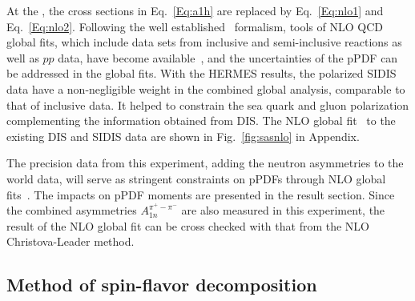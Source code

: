 At the \nloo, the cross sections in Eq.~\ref{Eq:a1h}  are replaced by Eq.~\ref{Eq:nlo1}
and Eq.~\ref{Eq:nlo2}. Following the well established~\cite{defs2000} formalism, 
tools of NLO QCD global fits,
which include data sets from inclusive and semi-inclusive reactions as well as $pp$ data,
have become available~\cite{sassotnlo,DSSV2008}, and the uncertainties of the pPDF 
can be addressed in the global fits.
With the HERMES results, the polarized SIDIS data 
have a non-negligible weight in the combined global analysis, 
comparable to that of inclusive data. It helped 
to constrain the sea quark and gluon polarization complementing 
the information obtained from DIS.
The NLO global fit~\cite{sassotnlo} to the existing DIS and SIDIS data are shown in Fig.~\ref{fig:sasnlo} in Appendix. 

The precision data from this experiment, adding the 
 neutron asymmetries to the world data,  
will serve as stringent constraints on 
pPDFs through NLO global fits~\cite{epjcxj2006}.  
The impacts on pPDF moments are presented in the result section. 
Since the combined asymmetries $A_{1n}^{\pi^+ -\pi^-}$ 
are also measured in this experiment,  the result of the NLO global fit 
can be  cross checked with that from the NLO Christova-Leader method.

\subsection{Method of spin-flavor decomposition}

